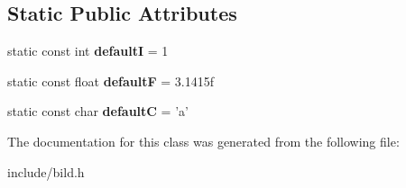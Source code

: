 \subsection*{Static Public Attributes}
\begin{DoxyCompactItemize}
\item 
\hypertarget{class_product_1_1_builder_a1fddb6d1d074e0d4bf645cdf7682e472}{static const int {\bfseries default\-I} = 1}\label{class_product_1_1_builder_a1fddb6d1d074e0d4bf645cdf7682e472}

\item 
\hypertarget{class_product_1_1_builder_a8cace4d757ea26d56f7617b54b5c613c}{static const float {\bfseries default\-F} = 3.\-1415f}\label{class_product_1_1_builder_a8cace4d757ea26d56f7617b54b5c613c}

\item 
\hypertarget{class_product_1_1_builder_a963b27187fd08baa3ca4889aef639431}{static const char {\bfseries default\-C} = 'a'}\label{class_product_1_1_builder_a963b27187fd08baa3ca4889aef639431}

\end{DoxyCompactItemize}


The documentation for this class was generated from the following file\-:\begin{DoxyCompactItemize}
\item 
include/bild.\-h\end{DoxyCompactItemize}
